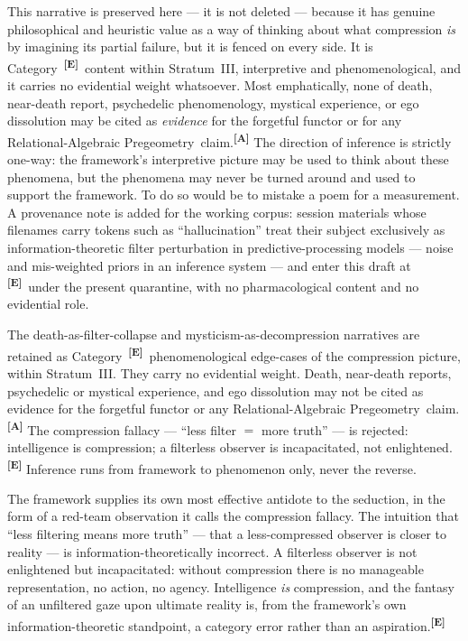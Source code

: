 \documentclass[12pt,a4paper,twoside]{article}
\theoremstyle{plain}
\theoremstyle{definition}
\theoremstyle{remark}
\newcommand{\ProjectShort}{Relational-Algebraic Pregeometry}
\newcommand{\RAP}{\ProjectShort}
\newcommand{\catmark}[1]{\textsuperscript{\textsf{\textbf{[#1]}}}}
\begin{document}
This narrative is preserved here --- it is not deleted --- because it
has genuine philosophical and heuristic value as a way of thinking about
what compression \emph{is} by imagining its partial failure, but it is
fenced on every side. It is Category~\catmark{E}\ content within
Stratum~III, interpretive and phenomenological, and it carries no
evidential weight whatsoever. Most emphatically, none of death,
near-death report, psychedelic phenomenology, mystical experience, or
ego dissolution may be cited as \emph{evidence} for the forgetful
functor or for any \RAP\ claim.\catmark{A} The direction of inference
is strictly one-way: the framework's interpretive picture may be used to
think about these phenomena, but the phenomena may never be turned
around and used to support the framework. To do so would be to mistake a
poem for a measurement. A provenance note is added for the working
corpus: session materials whose filenames carry tokens such as
``hallucination'' treat their subject exclusively as
information-theoretic filter perturbation in predictive-processing
models --- noise and mis-weighted priors in an inference system --- and
enter this draft at \catmark{E}\ under the present quarantine, with no
pharmacological content and no evidential role.

\begin{governancebox}
The death-as-filter-collapse and mysticism-as-decompression narratives
are retained as Category~\catmark{E}\ phenomenological edge-cases of the
compression picture, within Stratum~III. They carry no evidential
weight. Death, near-death reports, psychedelic or mystical experience,
and ego dissolution may not be cited as evidence for the forgetful
functor or any \RAP\ claim.\catmark{A} The compression fallacy ---
``less filter $=$ more truth'' --- is rejected: intelligence is
compression; a filterless observer is incapacitated, not
enlightened.\catmark{E} Inference runs from framework to phenomenon
only, never the reverse.
\end{governancebox}

The framework supplies its own most effective antidote to the seduction,
in the form of a red-team observation it calls the compression fallacy.
The intuition that ``less filtering means more truth'' --- that a
less-compressed observer is closer to reality --- is
information-theoretically incorrect. A filterless observer is not
enlightened but incapacitated: without compression there is no
manageable representation, no action, no agency. Intelligence \emph{is}
compression, and the fantasy of an unfiltered gaze upon ultimate reality
is, from the framework's own information-theoretic standpoint, a
category error rather than an aspiration.\catmark{E}
\end{document}
